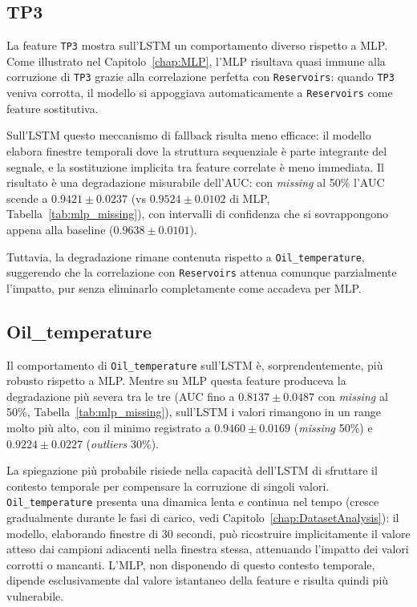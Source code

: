 \documentclass[../main.tex]{subfiles}
\begin{document}
\subsection{TP3}
La feature \texttt{TP3} mostra sull'LSTM un comportamento diverso rispetto a MLP. Come illustrato nel Capitolo~\ref{chap:MLP}, l'MLP risultava quasi immune alla corruzione di \texttt{TP3} grazie alla correlazione perfetta con \texttt{Reservoirs}: quando \texttt{TP3} veniva corrotta, il modello si appoggiava automaticamente a \texttt{Reservoirs} come feature sostitutiva.

Sull'LSTM questo meccanismo di fallback risulta meno efficace: il modello elabora finestre temporali dove la struttura sequenziale è parte integrante del segnale, e la sostituzione implicita tra feature correlate è meno immediata. Il risultato è una degradazione misurabile dell'AUC: con \textit{missing} al 50\% l'AUC scende a $0.9421 \pm 0.0237$ (vs $0.9524 \pm 0.0102$ di MLP, Tabella~\ref{tab:mlp_missing}), con intervalli di confidenza che si sovrappongono appena alla baseline ($0.9638 \pm 0.0101$).

Tuttavia, la degradazione rimane contenuta rispetto a \texttt{Oil\_temperature}, suggerendo che la correlazione con \texttt{Reservoirs} attenua comunque parzialmente l'impatto, pur senza eliminarlo completamente come accadeva per MLP.

\subsection{Oil\_temperature}
Il comportamento di \texttt{Oil\_temperature} sull'LSTM è, sorprendentemente, più robusto rispetto a MLP. Mentre su MLP questa feature produceva la degradazione più severa tra le tre (AUC fino a $0.8137 \pm 0.0487$ con \textit{missing} al 50\%, Tabella~\ref{tab:mlp_missing}), sull'LSTM i valori rimangono in un range molto più alto, con il minimo registrato a $0.9460 \pm 0.0169$ (\textit{missing} 50\%) e $0.9224 \pm 0.0227$ (\textit{outliers} 30\%).

La spiegazione più probabile risiede nella capacità dell'LSTM di sfruttare il contesto temporale per compensare la corruzione di singoli valori. \texttt{Oil\_temperature} presenta una dinamica lenta e continua nel tempo (cresce gradualmente durante le fasi di carico, vedi Capitolo~\ref{chap:DatasetAnalysis}): il modello, elaborando finestre di 30 secondi, può ricostruire implicitamente il valore atteso dai campioni adiacenti nella finestra stessa, attenuando l'impatto dei valori corrotti o mancanti. L'MLP, non disponendo di questo contesto temporale, dipende esclusivamente dal valore istantaneo della feature e risulta quindi più vulnerabile.
\end{document}

